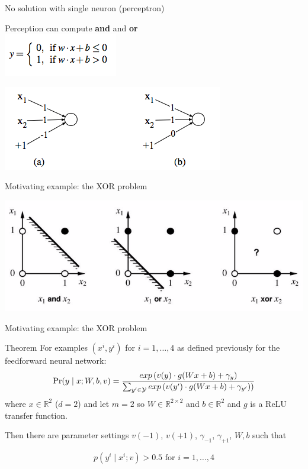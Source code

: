 \begin{frame}{No solution with single neuron (perceptron)}
\begin{block}{}
Perception can compute \textbf{and} and \textbf{or}\\
\centering
\includegraphics[scale=0.7]{figures/ff/perceqn.png}
\end{block}
\begin{block}{}
\includegraphics[scale=0.7]{figures/ff/percandor.png}
\end{block}
\end{frame}

\begin{frame}{Motivating example: the XOR problem}
\begin{block}{}
\includegraphics[scale=0.7]{figures/ff/xorfig.png}
\end{block}
\end{frame}

\begin{frame}{Motivating example: the XOR problem}
\begin{block}{Theorem}
For examples $(x^i, y^i)$ for $i = 1,\ldots,4$ as defined previously for the feedforward neural network:
\[ \Pr(y \mid x; W, b, v) = \frac{exp\left(v(y) \cdot g(Wx + b) + \gamma_y \right)}{\sum_{y' \in {\cal Y}} exp\left(v(y') \cdot g(Wx + b) + \gamma_{y'})\right)} \]
where $x \in \mathbb{R}^2$ ($d=2$) and let $m=2$ so $W \in \mathbb{R}^{2\times2}$ and $b \in \mathbb{R}^2$ and $g$ is a ReLU transfer function.

\pause
Then there are parameter settings $v(-1)$, $v(+1)$, $\gamma_{-1}$, $\gamma_{+1}$, $W, b$ such that 

\[ p(y^i \mid x^i; v) > 0.5 \textrm{   for } i = 1, \ldots, 4 \]
\end{block}
\end{frame}

